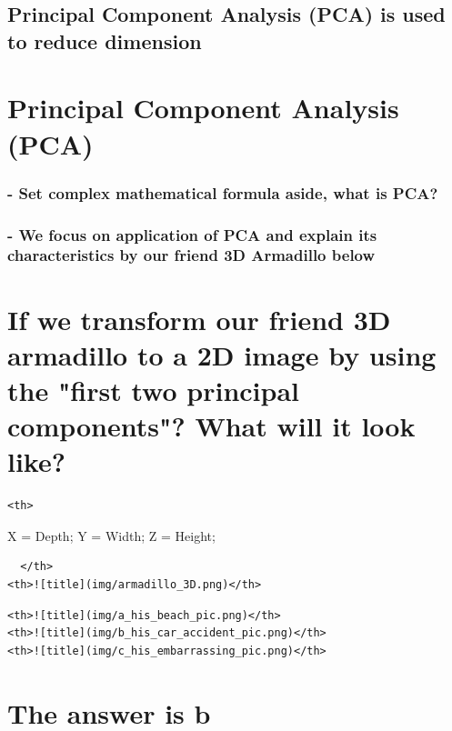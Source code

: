 \documentclass[11pt]{article}
\begin{document}
\subsection{Principal Component Analysis (PCA) is used to reduce
dimension}\label{principal-component-analysis-pca-is-used-to-reduce-dimension}

    \section{Principal Component Analysis
(PCA)}\label{principal-component-analysis-pca}

\subsubsection{- Set complex mathematical formula aside, what is
PCA?}\label{set-complex-mathematical-formula-aside-what-is-pca}

\subsubsection{- We focus on application of PCA and explain its
characteristics by our friend 3D Armadillo
below}\label{we-focus-on-application-of-pca-and-explain-its-characteristics-by-our-friend-3d-armadillo-below}

    \section{If we transform our friend 3D armadillo to a 2D image by using
the "first two principal components"? What will it look
like?}\label{if-we-transform-our-friend-3d-armadillo-to-a-2d-image-by-using-the-first-two-principal-components-what-will-it-look-like}

    \begin{verbatim}
<th>
\end{verbatim}

X = Depth; Y = Width; Z = Height;

\begin{verbatim}
  </th>
<th>![title](img/armadillo_3D.png)</th>
\end{verbatim}

    \begin{verbatim}
<th>![title](img/a_his_beach_pic.png)</th>
<th>![title](img/b_his_car_accident_pic.png)</th>
<th>![title](img/c_his_embarrassing_pic.png)</th>
\end{verbatim}

    \section{The answer is b}\label{the-answer-is-b}
\end{document}
